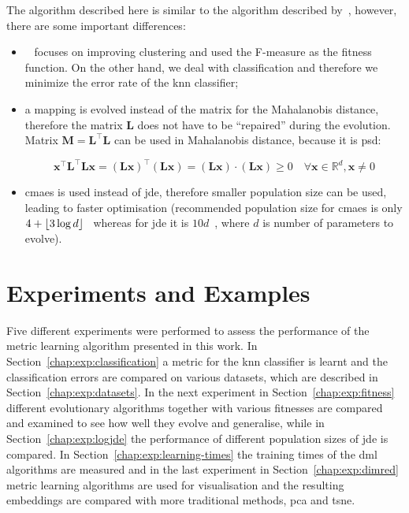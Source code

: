 The algorithm described here is similar to the algorithm described by~\citep{fukui2013evolutionary}, however, there are some important differences:
\begin{itemize}
\item~\citep{fukui2013evolutionary} focuses on improving clustering and used the \mbox{F-measure} as the fitness function. On the other hand, we deal with classification and therefore we minimize the error rate of the \ac{knn} classifier;
\item a mapping is evolved instead of the matrix for the Mahalanobis distance, therefore the matrix $\bm{L}$ does not have to be ``repaired'' during the evolution. Matrix $\bm{M}=\bm{L}^\top\bm{L}$ can be used in Mahalanobis distance, because it is \ac{psd}:

\begin{equation}
\bm{x}^\top \bm{L}^\top\bm{L}\bm{x}=(\bm{Lx})^\top(\bm{Lx})=(\bm{Lx})\cdot (\bm{Lx})\geq 0 \quad \forall \bm{x} \in \mathbb{R}^d, \bm{x} \neq 0 \label{eq:mah:proof}
\end{equation}

\item \ac{cmaes} is used instead of \ac{jde}, therefore smaller population size can be used, leading to faster optimisation (recommended population size for \ac{cmaes} is only $4+\lfloor3\log{d}\rfloor$~\citep{hansen2006cma} whereas for \ac{jde} it is $10d$~\citep{brest2006self}, where $d$ is number of parameters to evolve).
\end{itemize}



\chapter{Experiments and Examples} \label{chap:exp}
Five different experiments were performed to assess the performance of the metric learning algorithm presented in this work. In Section~\ref{chap:exp:classification} a metric for the \ac{knn} classifier is learnt and the classification errors are compared on various datasets, which are described in Section~\ref{chap:exp:datasets}. In the next experiment in Section~\ref{chap:exp:fitness} different evolutionary algorithms together with various fitnesses  are compared and examined to see how well they evolve and generalise, while in Section~\ref{chap:exp:logjde} the performance of different population sizes of \ac{jde} is compared. In Section~\ref{chap:exp:learning-times} the training times of the \ac{dml} algorithms are measured and in the last experiment in Section~\ref{chap:exp:dimred} metric learning algorithms are used for visualisation and the resulting embeddings are compared with more traditional methods, \ac{pca} and \ac{tsne}.

